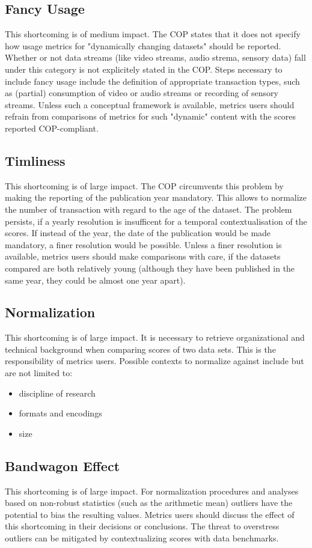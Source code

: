 \documentclass[conference, a4paper]{IEEEtran}\usepackage[]{graphicx}\usepackage[]{color}
\begin{document}
\subsection{Fancy Usage}
This shortcoming is of medium impact.
The COP states that it does not specify how usage metrics for "dynamically changing datasets"
should be reported.
Whether or not data streams (like video streams, audio strema, sensory data)
fall under this category is not explicitely stated in the COP.
Steps necessary to include fancy usage include the definition of appropriate transaction types,
such as (partial) consumption of video or audio  streams or recording of sensory streams.
Unless such a conceptual framework is available,
metrics users should refrain from comparisons of metrics for such "dynamic" content
with the scores reported COP-compliant.

\subsection{Timliness}
This shortcoming is of large impact.
The COP circumvents this problem by
making the reporting of the publication year mandatory.
This allows to normalize the number of transaction with regard to the age of the dataset.
The problem persists, if a yearly resolution is insufficent for
a temporal contextualisation of the scores.
If instead of the year, the date of the publication would be made mandatory,
a finer resolution would be possible.
Unless a finer resolution is available,
metrics users should make comparisons with care, if the datasets compared are both
relatively young
(although they have been published in the same year, they could be almost one year apart).

\subsection{Normalization}
This shortcoming is of large impact.
It is necessary to retrieve organizational and technical background when comparing scores
of two data sets.
This is the responsibility of metrics users.
Possible contexts to normalize against include but are not limited to:
\begin{itemize}
        \item discipline of research
        \item formats and encodings
        \item size
\end{itemize}

\subsection{Bandwagon Effect}
This shortcoming is of large impact.
For normalization procedures and analyses based on non-robust statistics
(such as the arithmetic mean) outliers have the potential to bias the resulting values.
Metrics users should discuss the effect of this shortcoming in their decisions or
conclusions.
The threat to overstress outliers can be mitigated by contextualizing scores
with data benchmarks.
\end{document}
